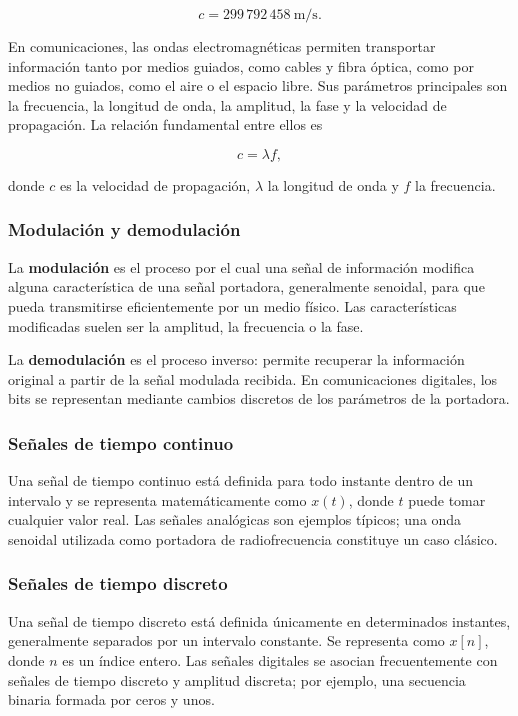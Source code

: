 \documentclass[12pt,a4paper]{article}
\begin{document}
\[
c=299\,792\,458\ \mathrm{m/s}.
\]

En comunicaciones, las ondas electromagnéticas permiten transportar
información tanto por medios guiados, como cables y fibra óptica, como por
medios no guiados, como el aire o el espacio libre. Sus parámetros principales
son la frecuencia, la longitud de onda, la amplitud, la fase y la velocidad de
propagación. La relación fundamental entre ellos es

\[
c=\lambda f,
\]

donde $c$ es la velocidad de propagación, $\lambda$ la longitud de onda y $f$
la frecuencia.

\subsubsection{Modulación y demodulación}

La \textbf{modulación} es el proceso por el cual una señal de información
modifica alguna característica de una señal portadora, generalmente senoidal,
para que pueda transmitirse eficientemente por un medio físico. Las
características modificadas suelen ser la amplitud, la frecuencia o la fase.

La \textbf{demodulación} es el proceso inverso: permite recuperar la
información original a partir de la señal modulada recibida. En comunicaciones
digitales, los bits se representan mediante cambios discretos de los parámetros
de la portadora.

\subsubsection{Señales de tiempo continuo}

Una señal de tiempo continuo está definida para todo instante dentro de un
intervalo y se representa matemáticamente como $x(t)$, donde $t$ puede tomar
cualquier valor real. Las señales analógicas son ejemplos típicos; una onda
senoidal utilizada como portadora de radiofrecuencia constituye un caso
clásico.

\subsubsection{Señales de tiempo discreto}

Una señal de tiempo discreto está definida únicamente en determinados
instantes, generalmente separados por un intervalo constante. Se representa
como $x[n]$, donde $n$ es un índice entero. Las señales digitales se asocian
frecuentemente con señales de tiempo discreto y amplitud discreta; por ejemplo,
una secuencia binaria formada por ceros y unos.
\end{document}
